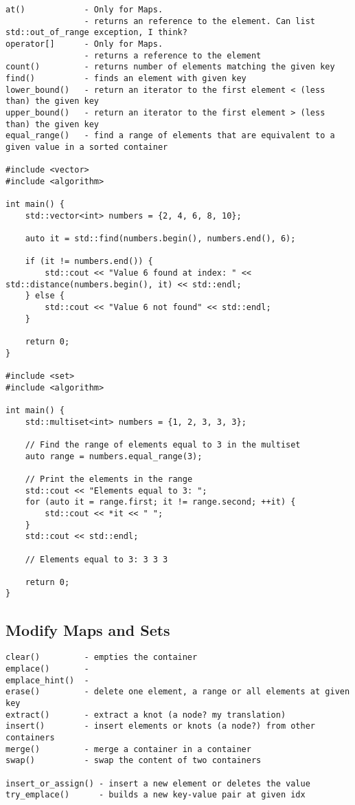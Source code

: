 \begin{verbatim}
at()            - Only for Maps.
                - returns an reference to the element. Can list std::out_of_range exception, I think? 
operator[]      - Only for Maps.
                - returns a reference to the element
count()         - returns number of elements matching the given key
find()          - finds an element with given key
lower_bound()   - return an iterator to the first element < (less than) the given key
upper_bound()   - return an iterator to the first element > (less than) the given key
equal_range()   - find a range of elements that are equivalent to a given value in a sorted container

#include <vector>
#include <algorithm>

int main() {
    std::vector<int> numbers = {2, 4, 6, 8, 10};

    auto it = std::find(numbers.begin(), numbers.end(), 6);

    if (it != numbers.end()) {
        std::cout << "Value 6 found at index: " << std::distance(numbers.begin(), it) << std::endl;
    } else {
        std::cout << "Value 6 not found" << std::endl;
    }

    return 0;
}

#include <set>
#include <algorithm>

int main() {
    std::multiset<int> numbers = {1, 2, 3, 3, 3};

    // Find the range of elements equal to 3 in the multiset
    auto range = numbers.equal_range(3);

    // Print the elements in the range
    std::cout << "Elements equal to 3: ";
    for (auto it = range.first; it != range.second; ++it) {
        std::cout << *it << " ";
    }
    std::cout << std::endl;

    // Elements equal to 3: 3 3 3

    return 0;
}
\end{verbatim}


\subsection{Modify Maps and Sets}

\begin{verbatim}
clear()         - empties the container
emplace()       -    
emplace_hint()  -  
erase()         - delete one element, a range or all elements at given key
extract()       - extract a knot (a node? my translation)
insert()        - insert elements or knots (a node?) from other containers
merge()         - merge a container in a container 
swap()          - swap the content of two containers 

insert_or_assign() - insert a new element or deletes the value
try_emplace()      - builds a new key-value pair at given idx
\end{verbatim}

